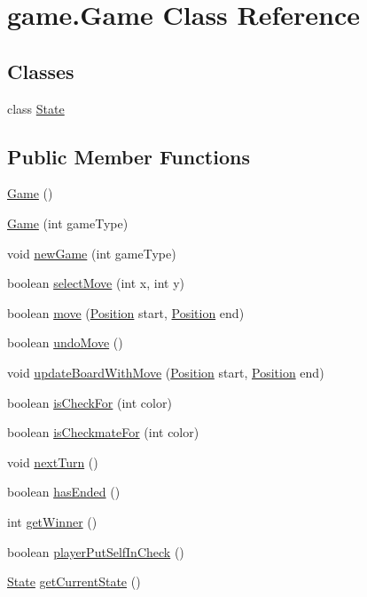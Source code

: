\hypertarget{classgame_1_1_game}{\section{game.\-Game Class Reference}
\label{classgame_1_1_game}
}
\subsection*{Classes}
\begin{DoxyCompactItemize}
\item 
class \hyperlink{classgame_1_1_game_1_1_state}{State}
\end{DoxyCompactItemize}
\subsection*{Public Member Functions}
\begin{DoxyCompactItemize}
\item 
\hyperlink{classgame_1_1_game_a901aa8c93a570f54854a9f08118a9451}{Game} ()
\item 
\hyperlink{classgame_1_1_game_aaefa1fc50584f2a2baf49974b704ae10}{Game} (int game\-Type)
\item 
void \hyperlink{classgame_1_1_game_ab6465ec6eafff324e0fc68ce665726ab}{new\-Game} (int game\-Type)
\item 
boolean \hyperlink{classgame_1_1_game_a08c47d9e26922ece9471182c46fe26f2}{select\-Move} (int x, int y)
\item 
boolean \hyperlink{classgame_1_1_game_a1d28d967b55b16467e07bf4b91bc274f}{move} (\hyperlink{classgame_1_1_position}{Position} start, \hyperlink{classgame_1_1_position}{Position} end)
\item 
boolean \hyperlink{classgame_1_1_game_a4c5b250a5732de27fef9f01d220e0932}{undo\-Move} ()
\item 
void \hyperlink{classgame_1_1_game_a828355cd26947a2473a273a1ff72d5ca}{update\-Board\-With\-Move} (\hyperlink{classgame_1_1_position}{Position} start, \hyperlink{classgame_1_1_position}{Position} end)
\item 
boolean \hyperlink{classgame_1_1_game_a7addda3056ed9f058c2c43c39d0db266}{is\-Check\-For} (int color)
\item 
boolean \hyperlink{classgame_1_1_game_a12eeb8d6a4b495aa0119aaaf6f3a1fd0}{is\-Checkmate\-For} (int color)
\item 
void \hyperlink{classgame_1_1_game_a0b0bcb102480072383c993fe21a2f788}{next\-Turn} ()
\item 
boolean \hyperlink{classgame_1_1_game_a1d7d7789913fc86cc195d49fbc61a4b4}{has\-Ended} ()
\item 
int \hyperlink{classgame_1_1_game_aad20d0a2c0db52757cdd44daf085396a}{get\-Winner} ()
\item 
boolean \hyperlink{classgame_1_1_game_a45abcf63801ae8a47951c840aebe6309}{player\-Put\-Self\-In\-Check} ()
\item 
\hyperlink{classgame_1_1_game_1_1_state}{State} \hyperlink{classgame_1_1_game_a0aab6da42b87bd5b3d5e86b2f3548ea3}{get\-Current\-State} ()
\end{DoxyCompactItemize}
